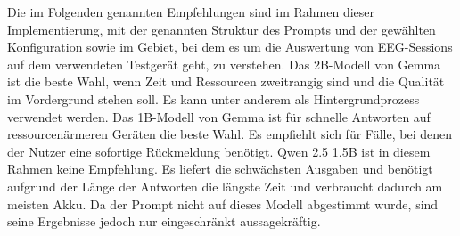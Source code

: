 \noindent Die im Folgenden genannten Empfehlungen sind im Rahmen dieser Implementierung, mit der genannten Struktur des Prompts und der gewählten Konfiguration sowie im Gebiet, bei dem es um die Auswertung von \ac{EEG}-Sessions auf dem verwendeten Testgerät geht, zu verstehen. Das 2B-Modell von Gemma ist die beste Wahl, wenn Zeit und Ressourcen zweitrangig sind und die Qualität im Vordergrund stehen soll. Es kann unter anderem als Hintergrundprozess verwendet werden. Das 1B-Modell von Gemma ist für schnelle Antworten auf ressourcenärmeren Geräten die beste Wahl. Es empfiehlt sich für Fälle, bei denen der Nutzer eine sofortige Rückmeldung benötigt. Qwen 2.5 1.5B ist in diesem Rahmen keine Empfehlung. Es liefert die schwächsten Ausgaben und benötigt aufgrund der Länge der Antworten die längste Zeit und verbraucht dadurch am meisten Akku. Da der Prompt nicht auf dieses Modell abgestimmt wurde, sind seine Ergebnisse jedoch nur eingeschränkt aussagekräftig.
